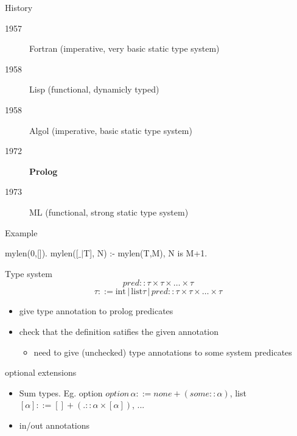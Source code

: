 \documentclass{beamer}
\begin{document}
\begin{frame}{History}
 \begin{description}
   \item[1957] Fortran (imperative, very basic static type system)
   \item[1958] Lisp (functional, dynamicly typed)
   \item[1958] Algol (imperative, basic static type system)
   \item[1972] \textbf{Prolog}
   \item[1973] ML (functional, strong static type system)
\end{description}
\end{frame}
\begin{frame}{Example}

  mylen(0,[]).\newline
  mylen([$\_|$T], N) :- mylen(T,M), N is M+1.

\end{frame}
\begin{frame}{Type system}
$$
 pred :: \tau \times \tau\times\dots\times\tau 
 $$ 
 $$
 \tau ::= \text{int} \,|\, \text{list} \tau\,|\, pred :: \tau \times \tau\times\dots\times\tau
 $$
 \begin{itemize}
  \item give type annotation to prolog predicates
  \item check that the definition satifies the given annotation
  \begin{itemize}
   \item need to give (unchecked) type annotations to some system predicates
  \end{itemize}
 \end{itemize}

 
\end{frame}
\begin{frame}{optional extensions}
 \begin{itemize}
  \item Sum types. Eg. option $option\, \alpha ::= none + (some :: \alpha)$, list $[\alpha] ::= [] + (. :: \alpha \times [\alpha])$, ...
  \item in/out annotations
 \end{itemize}

\end{frame}
\end{document}
